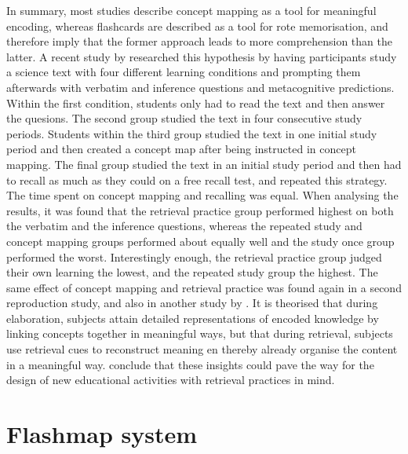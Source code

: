 In summary, most studies describe concept mapping as a tool for meaningful encoding, whereas flashcards are described as a tool for rote memorisation, and therefore imply that the former approach leads to more comprehension than the latter. A recent study by  researched this hypothesis by having participants study a science text with four different learning conditions and prompting them afterwards with verbatim and inference questions and metacognitive predictions. Within the first condition, students only had to read the text and then answer the quesions. The second group studied the text in four consecutive study periods. Students within the third group studied the text in one initial study period and then created a concept map after being instructed in concept mapping. The final group studied the text in an initial study period and then had to recall as much as they could on a free recall test, and repeated this strategy. The time spent on concept mapping and recalling was equal. When analysing the results, it was found that the retrieval practice group performed highest on both the verbatim and the inference questions, whereas the repeated study and concept mapping groups performed about equally well and the study once group performed the worst. Interestingly enough, the retrieval practice group judged their own learning the lowest, and the repeated study group the highest. The same effect of concept mapping and retrieval practice was found again in a second reproduction study, and also in another study by . It is theorised that during elaboration, subjects attain detailed representations of encoded knowledge by linking concepts together in meaningful ways, but that during retrieval, subjects use retrieval cues to reconstruct meaning en thereby already organise the content in a meaningful way.  conclude that these insights could pave the way for the design of new educational activities with retrieval practices in mind.

\section{Flashmap system}

